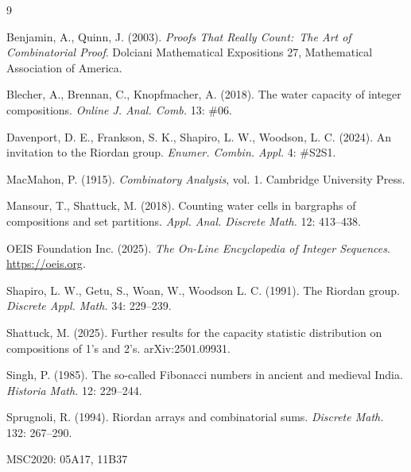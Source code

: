 \documentclass[]{interact}
\theoremstyle{plain}
\numberwithin{equation}{section} %
\numberwithin{table}{section} %
\numberwithin{figure}{section}
\begin{document}
\begin{thebibliography}{9}

Benjamin, A., Quinn, J. (2003). \textit{Proofs That Really Count:\ The Art of Combinatorial Proof}. Dolciani Mathematical Expositions 27, Mathematical Association of America.

Blecher, A., Brennan, C., Knopfmacher, A. (2018).  The water capacity of integer compositions. \textit{Online J. Anal. Comb.} 13: \#06.%

Davenport, D. E., Frankson, S. K., Shapiro, L. W., Woodson, L. C. (2024). An invitation to the Riordan group. \textit{Enumer. Combin. Appl.} 4: \#S2S1.%

MacMahon, P. (1915).  \textit{Combinatory Analysis}, vol. 1. Cambridge University Press.

Mansour, T., Shattuck, M. (2018). Counting water cells in bargraphs of compositions and set partitions. \textit{Appl. Anal. Discrete Math.} 12: 413--438.

OEIS Foundation Inc. (2025). \textit{The On-Line Encyclopedia of Integer Sequences}. \url{https://oeis.org}.

Shapiro, L. W., Getu, S., Woan, W., Woodson L. C. (1991). The Riordan group. \textit{Discrete Appl. Math.} 34: 229--239.

Shattuck, M. (2025). Further results for the capacity statistic distribution on compositions of 1's and 2's.  arXiv:2501.09931.

Singh, P. (1985). The so-called Fibonacci numbers in ancient and medieval India. \textit{Historia Math.} 12: 229--244.

Sprugnoli, R. (1994). Riordan arrays and combinatorial sums. \textit{Discrete Math.} 132: 267--290.

\end{thebibliography}

\medskip

\noindent MSC2020: 05A17, 11B37
\end{document}

